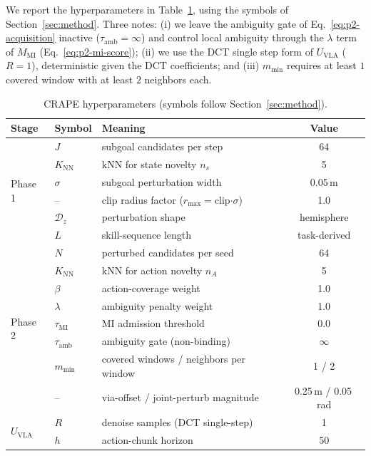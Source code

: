 \documentclass{article}
\begin{document}
We report the hyperparameters in Table~\ref{tab:hparams}, using the symbols of
Section~\ref{sec:method}. Three notes: (i) we leave the ambiguity gate of
Eq.~\eqref{eq:p2-acquisition} inactive ($\tau_{\mathrm{amb}}{=}\infty$) and control
local ambiguity through the $\lambda$ term of $M_{\mathrm{MI}}$
(Eq.~\eqref{eq:p2-mi-score}); (ii) we use the DCT single step form of
$U_{\mathrm{VLA}}$ ($R{=}1$), deterministic given the DCT coefficients; and (iii)
$m_{\min}$ requires at least $1$ covered window with at least $2$ neighbors each.

\begin{table}[h]
\centering
\caption{CRAPE hyperparameters (symbols follow Section~\ref{sec:method}).}
\label{tab:hparams}
\small
\setlength{\tabcolsep}{6pt}
\begin{tabular}{lllc}
\toprule
\textbf{Stage} & \textbf{Symbol} & \textbf{Meaning} & \textbf{Value} \\
\midrule
\multirow{6}{*}{Phase 1}
 & $J$               & subgoal candidates per step                        & 64 \\
 & $K_{\mathrm{NN}}$ & kNN for state novelty $n_s$                        & 5 \\
 & $\sigma$          & subgoal perturbation width                         & 0.05\,m \\
 & --                & clip radius factor ($r_{\max}{=}$clip$\cdot\sigma$) & 1.0 \\
 & $\mathcal{D}_z$   & perturbation shape                                 & hemisphere \\
 & $L$               & skill-sequence length                              & task-derived \\
\midrule
\multirow{8}{*}{Phase 2}
 & $N$               & perturbed candidates per seed                      & 64 \\
 & $K_{\mathrm{NN}}$ & kNN for action novelty $n_A$                       & 5 \\
 & $\beta$           & action-coverage weight                             & 1.0 \\
 & $\lambda$         & ambiguity penalty weight                           & 1.0 \\
 & $\tau_{\mathrm{MI}}$  & MI admission threshold                         & 0.0 \\
 & $\tau_{\mathrm{amb}}$ & ambiguity gate (non-binding)                   & $\infty$ \\
 & $m_{\min}$        & covered windows / neighbors per window             & 1 / 2 \\
 & --                & via-offset / joint-perturb magnitude               & 0.25\,m / 0.05\,rad \\
\midrule
\multirow{2}{*}{$U_{\mathrm{VLA}}$}
 & $R$               & denoise samples (DCT single-step)                  & 1 \\
 & $h$               & action-chunk horizon                               & 50 \\
\bottomrule
\end{tabular}
\end{table}
\end{document}
